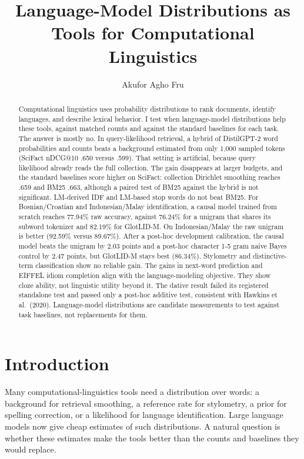 \documentclass[11pt]{article}
\title{Language-Model Distributions as Tools for Computational Linguistics}
\author{Akufor Agho Fru}
\begin{document}
\maketitle

\begin{abstract}
Computational linguistics uses probability distributions to rank documents,
identify languages, and describe lexical behavior. I test when
language-model distributions help these tools, against matched counts and
against the standard baselines for each task. The answer is mostly no. In
query-likelihood retrieval, a hybrid of DistilGPT-2 word probabilities and
counts beats a background estimated from only 1,000 sampled tokens (SciFact
nDCG@10 .650 versus .599). That setting is artificial, because query
likelihood already reads the full collection. The gain disappears at larger
budgets, and the standard baselines score higher on SciFact: collection
Dirichlet smoothing reaches .659 and BM25 .663, although a paired test of BM25
against the hybrid is not significant. LM-derived IDF and LM-based stop words do not beat
BM25. For Bosnian/Croatian and Indonesian/Malay identification, a causal model
trained from scratch reaches 77.94\% raw accuracy, against 76.24\% for a
unigram that shares its subword tokenizer and 82.19\% for GlotLID-M. On
Indonesian/Malay the raw unigram is better (92.59\% versus 89.67\%). After a
post-hoc development calibration, the causal model beats the unigram by 2.03
points and a post-hoc character 1-5 gram naive Bayes control by 2.47 points,
but GlotLID-M stays best (86.34\%). Stylometry and distinctive-term classification show no
reliable gain. The gains in next-word prediction and EIFFEL idiom completion align with
the language-modeling objective.
They show cloze ability, not linguistic utility beyond it. The dative result
failed its registered standalone test and passed only a post-hoc additive
test, consistent with Hawkins et al.\ (2020). Language-model
distributions are candidate measurements to test against task baselines, not
replacements for them.
\end{abstract}

\section{Introduction}

Many computational-linguistics tools need a distribution over words: a
background for retrieval smoothing, a reference rate for stylometry, a prior
for spelling correction, or a likelihood for language identification. Large
language models now give cheap estimates of such distributions. A natural
question is whether these estimates make the tools better than the counts and
baselines they would replace.
\end{document}
